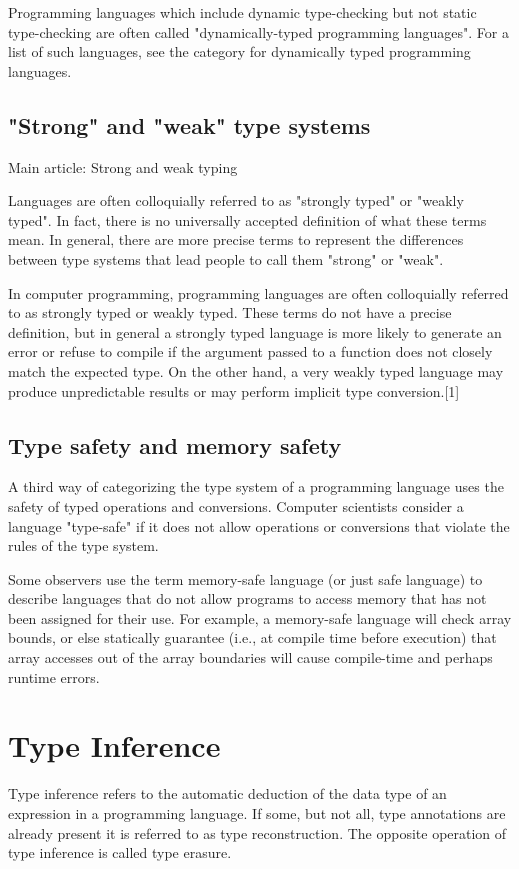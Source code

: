 \documentclass[12pt,b5paper]{book}
\theoremstyle{definition}
\begin{document}
Programming languages which include dynamic type-checking but not static type-checking are often called "dynamically-typed programming languages". For a list of such languages, see the category for dynamically typed programming languages.


\subsection{"Strong" and "weak" type systems}

Main article: Strong and weak typing

Languages are often colloquially referred to as "strongly typed" or "weakly typed". In fact, there is no universally accepted definition of what these terms mean. In general, there are more precise terms to represent the differences between type systems that lead people to call them "strong" or "weak".

In computer programming, programming languages are often colloquially referred to as strongly typed or weakly typed. These terms do not have a precise definition, but in general a strongly typed language is more likely to generate an error or refuse to compile if the argument passed to a function does not closely match the expected type. On the other hand, a very weakly typed language may produce unpredictable results or may perform implicit type conversion.[1]

\subsection{Type safety and memory safety}

A third way of categorizing the type system of a programming language uses the safety of typed operations and conversions. Computer scientists consider a language "type-safe" if it does not allow operations or conversions that violate the rules of the type system.

Some observers use the term memory-safe language (or just safe language) to describe languages that do not allow programs to access memory that has not been assigned for their use. For example, a memory-safe language will check array bounds, or else statically guarantee (i.e., at compile time before execution) that array accesses out of the array boundaries will cause compile-time and perhaps runtime errors.


\section{Type Inference}
Type inference refers to the automatic deduction of the data type of an expression in a programming language. If some, but not all, type annotations are already present it is referred to as type reconstruction. The opposite operation of type inference is called type erasure.
\end{document}
